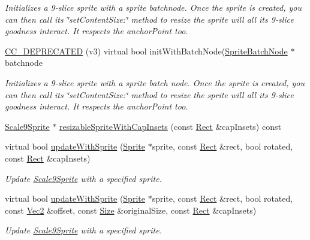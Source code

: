 \begin{DoxyCompactItemize}
\begin{DoxyCompactList}\small\item\em Initializes a 9-\/slice sprite with a sprite batchnode. Once the sprite is created, you can then call its \char`\"{}set\+Content\+Size\+:\char`\"{} method to resize the sprite will all it\textquotesingle{}s 9-\/slice goodness interact. It respects the anchor\+Point too. \end{DoxyCompactList}\item 
\hyperlink{classui_1_1Scale9Sprite_ac7989890a826ab703510c852f87e9ebe}{C\+C\+\_\+\+D\+E\+P\+R\+E\+C\+A\+T\+ED} (v3) virtual bool init\+With\+Batch\+Node(\hyperlink{classSpriteBatchNode}{Sprite\+Batch\+Node} $\ast$batchnode
\begin{DoxyCompactList}\small\item\em Initializes a 9-\/slice sprite with a sprite batch node. Once the sprite is created, you can then call its \char`\"{}set\+Content\+Size\+:\char`\"{} method to resize the sprite will all it\textquotesingle{}s 9-\/slice goodness interact. It respects the anchor\+Point too. \end{DoxyCompactList}\item 
\hyperlink{classui_1_1Scale9Sprite}{Scale9\+Sprite} $\ast$ \hyperlink{classui_1_1Scale9Sprite_a0ef84c5db252c4f7efef277e8afb75a4}{resizable\+Sprite\+With\+Cap\+Insets} (const \hyperlink{classRect}{Rect} \&cap\+Insets) const
\item 
virtual bool \hyperlink{classui_1_1Scale9Sprite_a853e00c69eb4278aabb26006aafbbb49}{update\+With\+Sprite} (\hyperlink{classSprite}{Sprite} $\ast$sprite, const \hyperlink{classRect}{Rect} \&rect, bool rotated, const \hyperlink{classRect}{Rect} \&cap\+Insets)
\begin{DoxyCompactList}\small\item\em Update \hyperlink{classui_1_1Scale9Sprite}{Scale9\+Sprite} with a specified sprite. \end{DoxyCompactList}\item 
virtual bool \hyperlink{classui_1_1Scale9Sprite_ad82fa6bbc0609dddf8b879b3e1538948}{update\+With\+Sprite} (\hyperlink{classSprite}{Sprite} $\ast$sprite, const \hyperlink{classRect}{Rect} \&rect, bool rotated, const \hyperlink{classVec2}{Vec2} \&offset, const \hyperlink{classSize}{Size} \&original\+Size, const \hyperlink{classRect}{Rect} \&cap\+Insets)
\begin{DoxyCompactList}\small\item\em Update \hyperlink{classui_1_1Scale9Sprite}{Scale9\+Sprite} with a specified sprite. \end{DoxyCompactList}\item 

\end{DoxyCompactItemize}
